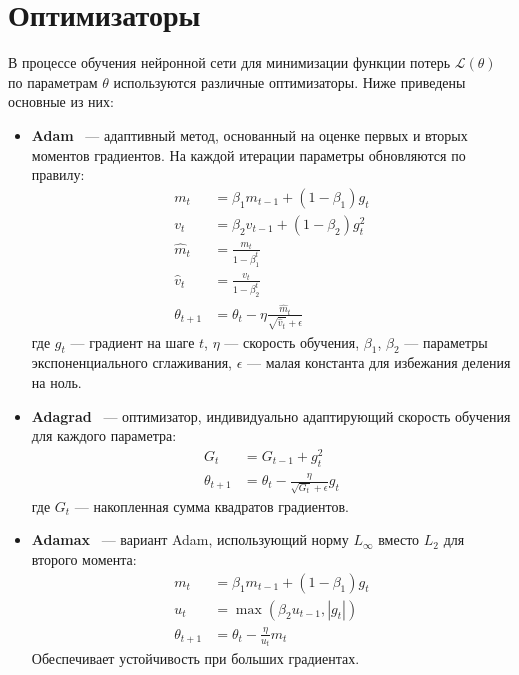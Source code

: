 \section{Оптимизаторы}
В процессе обучения нейронной сети для минимизации функции потерь $\mathcal{L}(\theta)$ по параметрам $\theta$ используются различные оптимизаторы. Ниже приведены основные из них:

\begin{itemize}
    \item \textbf{Adam}~\cite{kingma2014adam} --- адаптивный метод, основанный на оценке первых и вторых моментов градиентов. На каждой итерации параметры обновляются по правилу:
    \[
    \begin{aligned}
        m_t &= \beta_1 m_{t-1} + (1 - \beta_1) g_t \\
        v_t &= \beta_2 v_{t-1} + (1 - \beta_2) g_t^2 \\
        \hat{m}_t &= \frac{m_t}{1 - \beta_1^t} \\
        \hat{v}_t &= \frac{v_t}{1 - \beta_2^t} \\
        \theta_{t+1} &= \theta_t - \eta \frac{\hat{m}_t}{\sqrt{\hat{v}_t} + \epsilon}
    \end{aligned}
    \]
    где $g_t$ --- градиент на шаге $t$, $\eta$ --- скорость обучения, $\beta_1$, $\beta_2$ --- параметры экспоненциального сглаживания, $\epsilon$ --- малая константа для избежания деления на ноль.

    \item \textbf{Adagrad}~\cite{duchi2011adaptive} --- оптимизатор, индивидуально адаптирующий скорость обучения для каждого параметра:
    \[
    \begin{aligned}
        G_t &= G_{t-1} + g_t^2 \\
        \theta_{t+1} &= \theta_t - \frac{\eta}{\sqrt{G_t} + \epsilon} g_t
    \end{aligned}
    \]
    где $G_t$ --- накопленная сумма квадратов градиентов.

    \item \textbf{Adamax}~\cite{kingma2014adam} --- вариант Adam, использующий норму $L_\infty$ вместо $L_2$ для второго момента:
    \[
    \begin{aligned}
        m_t &= \beta_1 m_{t-1} + (1 - \beta_1) g_t \\
        u_t &= \max(\beta_2 u_{t-1}, |g_t|) \\
        \theta_{t+1} &= \theta_t - \frac{\eta}{u_t} m_t
    \end{aligned}
    \]
    Обеспечивает устойчивость при больших градиентах.


\end{itemize}
